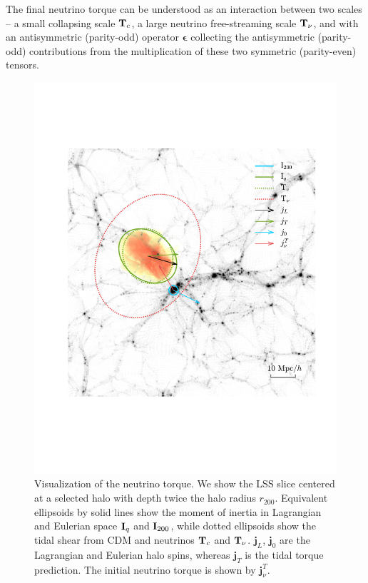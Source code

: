 \documentclass[aps,prd,twocolumn,amsmath,amssymb,amsfont,superscriptaddress,nofootinbib]{revtex4-1}
\newcommand{\bs}{\boldsymbol}
\newcommand{\T}{\bold{T}}
\newcommand{\I}{\bold{I}}
\newcommand{\spin}{\bs{j}}
\begin{document}
The final neutrino torque can be understood as an interaction between two scales -- a small collapsing scale $\T_c$,
a large neutrino free-streaming scale $\T_\nu$,
and with an antisymmetric (parity-odd) operator $\bs{\epsilon}$ collecting the antisymmetric (parity-odd) contributions from the multiplication of these two symmetric (parity-even) tensors.

 

\begin{figure}
\centering
  \includegraphics[width=1\linewidth]{f1}
 \caption{Visualization of the neutrino torque. 
 We show the LSS slice centered at a selected halo with depth twice the halo radius $r_{200}$. 
 Equivalent ellipsoids by solid lines show the moment of inertia in Lagrangian and Eulerian space $\I_q$ and $\I_{200}$, 
 while dotted ellipsoids show the tidal shear from CDM and neutrinos $\T_c$ and $\T_\nu$. $\spin_L$, 
 $\spin_0$ are the Lagrangian and Eulerian halo spins, whereas $\spin_T$ is the tidal torque prediction. 
 The initial neutrino torque is shown by $\spin^T_\nu$.}\label{fig.1}
\end{figure}
\end{document}
